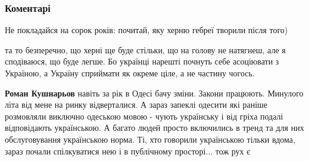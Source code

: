  
 
 
 
 
\subsubsection{Коментарі}
\label{sec:27_07_2021.fb.kushnarjev_roman.1.kakzhetak.cmt}

\begin{itemize}
 
Не покладайся на сорок років: почитай, яку херню гебреї творили після того)

\begin{itemize}
 

та то безперечно, що херні ще буде стільки, що на голову не натягнеш, але я
сподіваюся, що буде легше. Бо українці нарешті почнуть себе асоціювати з
Україною, а Україну сприймати як окреме ціле, а не частину чогось.


 
\textbf{Роман Кушнарьов} навіть за рік в Одесі бачу зміни. Закони працюють.
Минулого літа від мене на ринку відверталися. А зараз запеклі одесити які
раніше розмовляли виключно одеською мовою - чують українську і від гріха подалі
відповідають українською. А багато людей просто включились в тренд та для них
обслуговування українською норма. Ті, хто говорили українською тільки вдома,
зараз почали спілкуватися нею і в публічному просторі... тож рух є
\end{itemize}


\end{itemize}
